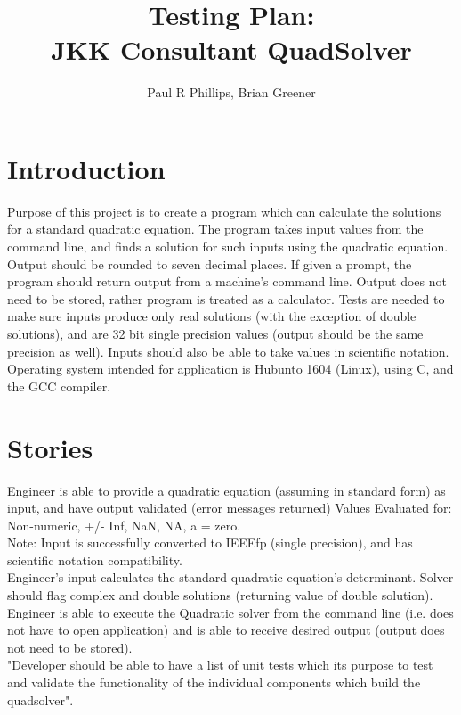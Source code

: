 \documentclass[notitlepage,a4paper,12pt]{article}
\author{Paul R Phillips, Brian Greener}
\title{Testing Plan:\\JKK Consultant QuadSolver}
\begin{document}
\maketitle

\section*{Introduction} 

Purpose of this project is to create a program which can calculate the solutions for a standard quadratic equation. The program takes input values from the command line, and finds a solution for such inputs using the quadratic equation. Output should be rounded to seven decimal places. If given a prompt, the program should return output from a machine's command line. Output does not need to be stored, rather program is treated as a calculator. Tests are needed to make sure inputs produce only real solutions (with the exception of double solutions), and are 32 bit single precision values (output should be the same precision as well). Inputs should also be able to take values in scientific notation. Operating system intended for application is Hubunto 1604 (Linux), using C, and the GCC compiler. 

\section*{Stories}
Engineer is able to provide a quadratic equation (assuming in standard form) as input, and have output validated (error messages returned)
Values Evaluated for: Non-numeric, +/- Inf, NaN, NA, a = zero. \\

Note: Input is successfully converted to IEEEfp (single precision), and has scientific notation compatibility. \\

Engineer's input calculates the standard quadratic equation's determinant. Solver should flag complex and double solutions (returning value of double solution). \\

Engineer is able to execute the Quadratic solver from the command line (i.e. does not have to open application) and is able to receive desired output (output does not need to be stored). \\

"Developer should be able to have a list of unit tests
which its purpose to test and validate the functionality of the individual components which build the quadsolver". \\
\end{document}
